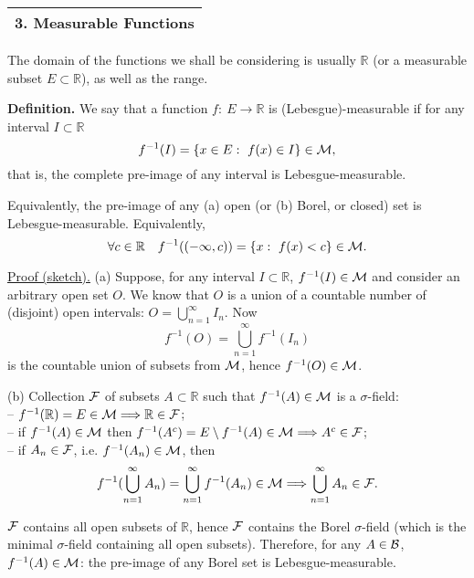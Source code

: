 \documentclass[a4paper,10pt]{article}
\def\RR{\mathbb{R}}
\newcommand{\1}[1]{\mathbf{1}_{\{#1\}}}
\begin{document}
\Large

\begin{tabular}{|l|}
\hline {\LARGE\bf 3. Measurable Functions}\\
\hline\end{tabular}
\vspace{5mm}

The domain of the functions we shall be considering is usually $\RR$ (or a measurable subset $E\subset\RR$), as well as the range.\vspace{3mm}

{\bf Definition.} We say that a function $f:~E\to\RR$ is (Lebesgue)-measurable if for any interval $I\subset\RR$
  $$f^{-1}(I)=\{x\in E:~f(x)\in I\}\in{\cal M},$$
that is, the complete pre-image of any interval is Lebesgue-measurable.\vspace{3mm}

Equivalently, the pre-image of any (a) open (or (b) Borel, or closed) set is Lebesgue-measurable. Equivalently,
  $$\forall c\in\RR~~~f^{-1}((-\infty,c))=\{x:~f(x)<c\}\in{\cal M}.$$\vspace{3mm}

\underline{Proof (sketch).} (a) Suppose, for any interval $I\subset \RR$, $f^{-1}(I)\in{\cal M}$ and consider an arbitrary open set $O$. We know that $O$ is a union of a countable number of (disjoint) open intervals: $O=\bigcup_{n=1}^\infty I_n$. Now
  $$f^{-1}(O)=\bigcup_{n=1}^\infty f^{-1}(I_n)$$
is the countable union of subsets from $\cal M$, hence $f^{-1}(O)\in{\cal M}$.

(b) Collection $\cal F$ of subsets $A\subset\RR$ such that $f^{-1}(A)\in{\cal M}$ is a $\sigma$-field:\\
-- $f^{-1}(\RR)=E\in{\cal M}\Longrightarrow \RR\in{\cal F}$;\\
-- if $f^{-1}(A)\in{\cal M}$ then $f^{-1}(A^c)=E\setminus f^{-1}(A)\in{\cal M}\Longrightarrow A^c\in{\cal F}$;\\
-- if $A_n\in{\cal F}$, i.e. $f^{-1}(A_n)\in{\cal M}$, then
  $$f^{-1}(\bigcup_{n=1}^\infty A_n)=\bigcup_{n=1}^\infty f^{-1}(A_n)\in{\cal M}\Longrightarrow \bigcup_{n=1}^\infty A_n\in{\cal F}.$$

$\cal F$ contains all open subsets of $\RR$, hence $\cal F$ contains the Borel $\sigma$-field (which is the minimal $\sigma$-field containing all open subsets). Therefore, for any $A\in{\cal B}$, $f^{-1}(A)\in{\cal M}$: the pre-image of any Borel set is Lebesgue-measurable. \vspace{3cm}
\end{document}
